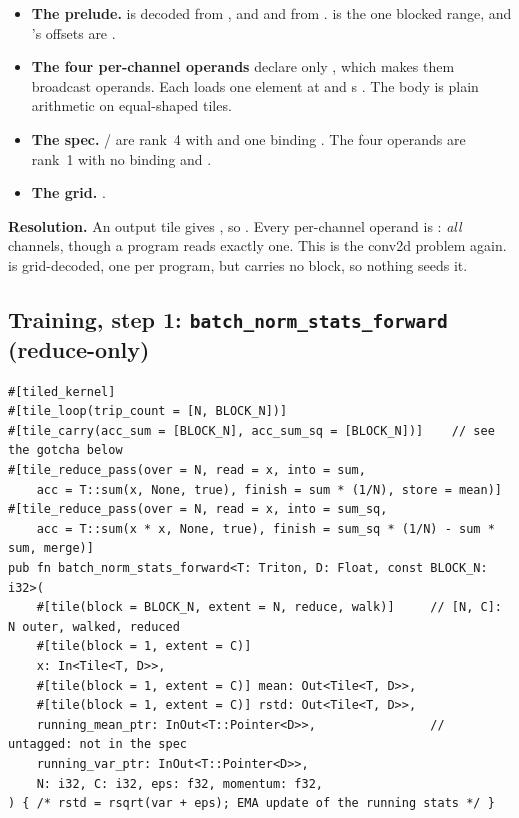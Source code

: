 \begin{itemize}
\item \textbf{The prelude.}  is decoded from , and
   and  from .  is the one blocked
  range, and 's offsets are .
\item \textbf{The four per-channel operands} declare only , which makes them
  broadcast operands. Each loads one element at  and
  s \code{[BLOCK_HW]}. The body is plain arithmetic on equal-shaped
  tiles.
\item \textbf{The spec.} / are rank~4 with
   and one binding . The four operands are rank~1 with no binding and
  .
\item \textbf{The grid.} \code{[B (Y), C, HW (BLOCK_HW)]}.
\end{itemize}

\textbf{Resolution.} An output tile \code{[1, 1, 1, 128]} gives , so . Every per-channel operand is
\code{[None]}: \emph{all}  channels, though a program reads exactly one. This
is the conv2d problem again.  is grid-decoded, one per program, but carries
no block, so nothing seeds it.

\subsection{Training, step 1: \texttt{batch\_norm\_stats\_forward} (reduce-only)}

\begin{lstlisting}
#[tiled_kernel]
#[tile_loop(trip_count = [N, BLOCK_N])]
#[tile_carry(acc_sum = [BLOCK_N], acc_sum_sq = [BLOCK_N])]    // see the gotcha below
#[tile_reduce_pass(over = N, read = x, into = sum,
    acc = T::sum(x, None, true), finish = sum * (1/N), store = mean)]
#[tile_reduce_pass(over = N, read = x, into = sum_sq,
    acc = T::sum(x * x, None, true), finish = sum_sq * (1/N) - sum * sum, merge)]
pub fn batch_norm_stats_forward<T: Triton, D: Float, const BLOCK_N: i32>(
    #[tile(block = BLOCK_N, extent = N, reduce, walk)]     // [N, C]: N outer, walked, reduced
    #[tile(block = 1, extent = C)]
    x: In<Tile<T, D>>,
    #[tile(block = 1, extent = C)] mean: Out<Tile<T, D>>,
    #[tile(block = 1, extent = C)] rstd: Out<Tile<T, D>>,
    running_mean_ptr: InOut<T::Pointer<D>>,                // untagged: not in the spec
    running_var_ptr: InOut<T::Pointer<D>>,
    N: i32, C: i32, eps: f32, momentum: f32,
) { /* rstd = rsqrt(var + eps); EMA update of the running stats */ }
\end{lstlisting}

